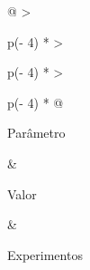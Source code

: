 \documentclass[conference,a4paper]{IEEEtran}
\begin{document}
\begin{table}[!tb]
\caption{Parâmetros e premissas experimentais.}\label{tab:3}
\centering\footnotesize\setlength{\tabcolsep}{4pt}
\renewcommand{\arraystretch}{1.12}
\begin{tabular}{@{}
  >{\raggedright\arraybackslash}p{(\textwidth - 4\tabcolsep) * }
  >{\raggedright\arraybackslash}p{(\textwidth - 4\tabcolsep) * }
  >{\raggedright\arraybackslash}p{(\textwidth - 4\tabcolsep) * }@{}}
\toprule

\begin{minipage}[b]{\linewidth}\raggedright
Parâmetro
\end{minipage} & \begin{minipage}[b]{\linewidth}\raggedright
Valor
\end{minipage} & \begin{minipage}[b]{\linewidth}\raggedright
Experimentos
\end{minipage} \\
\midrule\noalign{}


\end{tabular}
\end{table}
\end{document}
